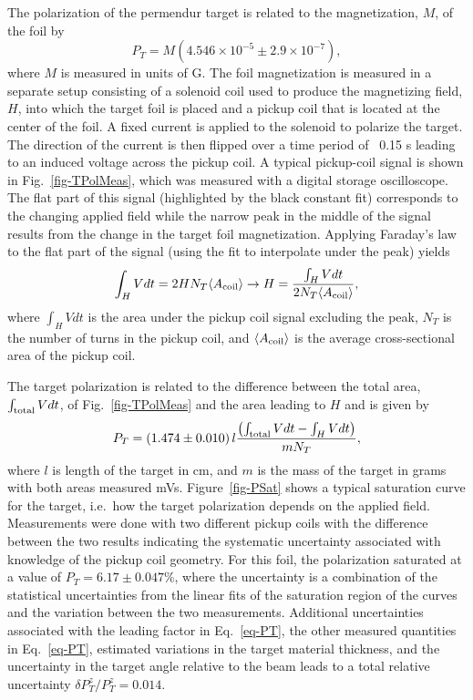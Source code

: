 The polarization of the permendur target is related to the magnetization, $M$, of the foil by \cite{Band:1997ee} 
%
\begin{equation}
\label{eq-M2Pt2}
	P_T=M\left(4.546\times 10^{-5}\pm 2.9\times 10^{-7}\right),
\end{equation}
%
where $M$ is measured in units of G. The foil magnetization is measured in a separate setup consisting of a solenoid coil used to produce 
the magnetizing field, $H$, into which the target foil is placed and a pickup coil that is located at the center of the foil. A fixed current is 
applied to the solenoid to polarize the target. The direction of the current is then flipped over a time period of ~0.15 s leading to an 
induced voltage across the pickup coil. A typical pickup-coil signal is shown in Fig.~\ref{fig-TPolMeas}, which was measured with a 
digital storage oscilloscope. The flat part of this signal (highlighted by the black constant fit) corresponds to the changing applied field while 
the narrow peak in the middle of the signal results from the change in the target foil magnetization. Applying Faraday's law to the flat part of 
the signal (using the fit to interpolate under the peak) yields
%
\begin{equation}
\label{eq-H}
	\int_H  Vdt=2HN_T \langle A_{\rm coil}\rangle\rightarrow H=\frac{\int_H Vdt}{2N_T\langle A_{\rm coil}\rangle} ,
\end{equation}
%
where $\int_H Vdt$ is the area under the pickup coil signal excluding the peak, $N_T$ is the number of turns in the pickup coil, and 
$\langle A_{\rm coil}\rangle$ is the average cross-sectional area of the pickup coil.


The target polarization is related to the difference between the total area, $\int_{\rm total} Vdt$, of Fig.~\ref{fig-TPolMeas} and the area 
leading to $H$ and is given by \cite{Band:1997ee} 
%
\begin{equation}
\label{eq-PT}
	P_T=\left(1.474\pm0.010\right)l\frac{\left({\int_{\rm total} Vdt-\int_HVdt}\right)}{mN_T},
\end{equation}
%
where  $l$ is length of the target in cm, and $m$ is the mass of the target in grams with both areas measured mVs. 
Figure~\ref{fig-PSat} shows a typical saturation curve for the target, i.e.~how 
the target polarization depends on the applied field. Measurements were done with two different pickup coils with the difference between 
the two results indicating the systematic uncertainty associated with knowledge of the pickup coil geometry. For this foil, the polarization
saturated at a value of $P_T=6.17\pm 0.047$\%, where the uncertainty is a combination of the statistical uncertainties from the linear fits of 
the saturation region of the curves and the variation between the two measurements. Additional uncertainties associated with the leading 
factor in Eq.~\ref{eq-PT}, the other measured quantities in Eq.~\ref{eq-PT}, estimated variations in the target material thickness, and the 
uncertainty in the target angle relative to the beam leads to a total relative uncertainty $\delta P_T^z/P_T^z=0.014$.




